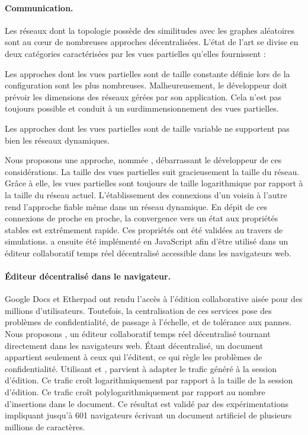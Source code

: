 \paragraph{Communication.} Les réseaux dont la topologie possède des similitudes
avec les graphes aléatoires sont au cœur de nombreuses approches
décentralisées. L'état de l'art se divise en deux catégories caractérisées par
les vues partielles qu'elles fournissent :
\begin{inparaenum}[(i)]
\item Les approches dont les vues partielles sont de taille constante définie
  lors de la configuration sont les plus nombreuses. Malheureusement, le
  développeur doit prévoir les dimensions des réseaux gérées par son
  application. Cela n'est pas toujours possible et conduit à un
  surdimmensionnement des vues partielles.
\item Les approches dont les vues partielles sont de taille variable ne
  supportent pas bien les réseaux dynamiques.
\end{inparaenum}
Nous proposons une approche, nommée \SPRAY, débarrassant le développeur de ces
considérations. La taille des vues partielles suit gracieusement la taille du
réseau. Grâce à elle, les vues partielles sont toujours de taille logarithmique
par rapport à la taille du réseau actuel. L'établissement des connexions d'un
voisin à l'autre rend l'approche fiable même dans un réseau dynamique. En dépit
de ces connexions de proche en proche, la convergence vers un état aux
propriétés stables est extrêmement rapide. Ces propriétés ont été validées au
travers de simulations. \SPRAY a ensuite été implémenté en JavaScript afin
d'être utilisé dans un éditeur collaboratif temps réel décentralisé accessible
dans les navigateurs web.

\paragraph{Éditeur décentralisé dans le navigateur.} Google Docs et Etherpad ont
rendu l'accès à l'édition collaborative aisée pour des millions
d'utilisateurs. Toutefois, la centralisation de ces services pose des problèmes
de confidentialité, de passage à l'échelle, et de tolérance aux pannes. Nous
proposons \CRATE, un éditeur collaboratif temps réel décentralisé tournant
directement dans les navigateurs web. Étant décentralisé, un document appartient
seulement à ceux qui l'éditent, ce qui règle les problèmes de
confidentialité. Utilisant \SPRAY et \LSEQ, \CRATE parvient à adapter le trafic
généré à la session d'édition. Ce trafic croît logarithmiquement par rapport à
la taille de la session d'édition. Ce trafic croît polylogarithmiquement par
rapport au nombre d'insertions dans le document. Ce résultat est validé par des
expérimentations impliquant jusqu'à 601 navigateurs écrivant un document
artificiel de plusieurs millions de caractères.

